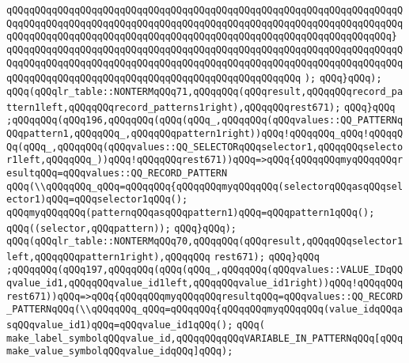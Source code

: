 \verb|qQQqqQQqqQQqqQQqqQQqqQQqqQQqqQQqqQQqqQQqqQQqqQQqqQQqqQQqqQQqqQQqqQQqqQQqqQQqqQQqqQQqqQQqqQQqqQQqqQQqqQQqqQQqqQQqqQQqqQQqqQQqqQQqqQQqqQQqqQQqqQQqqQQqqQQqqQQqqQQqqQQqqQQqqQQqqQQqqQQqqQQqqQQqqQQqqQQqqQQqqQQqqQQq}|\newline
\verb|qQQqqQQqqQQqqQQqqQQqqQQqqQQqqQQqqQQqqQQqqQQqqQQqqQQqqQQqqQQqqQQqqQQqqQQqqQQqqQQqqQQqqQQqqQQqqQQqqQQqqQQqqQQqqQQqqQQqqQQqqQQqqQQqqQQqqQQqqQQqqQQqqQQqqQQqqQQqqQQqqQQqqQQqqQQqqQQqqQQqqQQqqQQqqQQq|\newline
\verb|);|\newline
\verb|qQQq}qQQq);|\newline
\verb|qQQq(qQQqlr_table::NONTERMqQQq71,qQQqqQQq(qQQqresult,qQQqqQQqrecord_pattern1left,qQQqqQQqrecord_patterns1right),qQQqqQQqrest671);|\newline
\verb|qQQq}qQQq|\newline
\verb|;qQQqqQQq(qQQq196,qQQqqQQq(qQQq(qQQq_,qQQqqQQq(qQQqvalues::QQ_PATTERNqQQqpattern1,qQQqqQQq_,qQQqqQQqpattern1right))qQQq!qQQqqQQq_qQQq!qQQqqQQq(qQQq_,qQQqqQQq(qQQqvalues::QQ_SELECTORqQQqselector1,qQQqqQQqselector1left,qQQqqQQq_))qQQq!qQQqqQQqrest671))qQQq=>qQQq{qQQqqQQqmyqQQqqQQqresultqQQq=qQQqvalues::QQ_RECORD_PATTERN|\newline
\verb|qQQq(\\qQQqqQQq_qQQq=qQQqqQQq{qQQqqQQqmyqQQqqQQq(selectorqQQqasqQQqselector1)qQQq=qQQqselector1qQQq();|\newline
\verb|qQQqmyqQQqqQQq(patternqQQqasqQQqpattern1)qQQq=qQQqpattern1qQQq();|\newline
\verb|qQQq((selector,qQQqpattern));|\newline
\verb|qQQq}qQQq);|\newline
\verb|qQQq(qQQqlr_table::NONTERMqQQq70,qQQqqQQq(qQQqresult,qQQqqQQqselector1left,qQQqqQQqpattern1right),qQQqqQQq|\newline
\verb|rest671);|\newline
\verb|qQQq}qQQq|\newline
\verb|;qQQqqQQq(qQQq197,qQQqqQQq(qQQq(qQQq_,qQQqqQQq(qQQqvalues::VALUE_IDqQQqvalue_id1,qQQqqQQqvalue_id1left,qQQqqQQqvalue_id1right))qQQq!qQQqqQQqrest671))qQQq=>qQQq{qQQqqQQqmyqQQqqQQqresultqQQq=qQQqvalues::QQ_RECORD_PATTERNqQQq(\\qQQqqQQq_qQQq=qQQqqQQq{qQQqqQQqmyqQQqqQQq(value_idqQQqasqQQqvalue_id1)qQQq=qQQqvalue_id1qQQq();|\newline
\verb|qQQq(|\newline
\verb|make_label_symbolqQQqvalue_id,qQQqqQQqqQQqVARIABLE_IN_PATTERNqQQq[qQQqmake_value_symbolqQQqvalue_idqQQq]qQQq);|\newline
